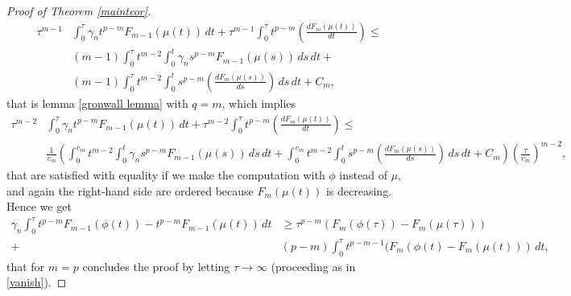 \documentclass[12pt]{article}
\theoremstyle{definition}
\theoremstyle{plain}
\theoremstyle{definition}
\begin{document}
\begin{proof}[Proof of Theorem \ref{mainteor}]
\begin{equation}
\begin{split}
            \tau^{m-1}&\int_0^\tau\gamma_nt^{p-m}F_{m-1}(\mu(t))\,dt+\tau^{m-1}\int_0^\tau t^{p-m}\left(\frac{dF_m(\mu(t))}{dt}\right)\leq\\&(m-1)\int_0^\tau t^{m-2}\int_0^t\gamma_n s^{p-m}F_{m-1}(\mu(s))\,ds\,dt+\\&(m-1)\int_0^\tau t^{m-2}\int_0^t s^{p-m}\left(\frac{dF_m(\mu(s))}{ds}\right)\,ds\,dt+C_m,
        \end{split}
    \end{equation}
    that is lemma \ref{gronwall lemma} with $q=m$, which implies
    \begin{equation*}
        \begin{split}
            \tau^{m-2}&\int_0^\tau\gamma_nt^{p-m}F_{m-1}(\mu(t))\,dt+\tau^{m-2}\int_0^\tau t^{p-m}\left(\frac{dF_m(\mu(t))}{dt}\right)\leq\\ &\frac{1}{v_m}\left(\int_0^{v_m}t^{m-2}\int_0^t\gamma_ns^{p-m}F_{m-1}(\mu(s))\,ds\,dt+\int_0^{v_m}t^{m-2}\int_0^ts^{p-m}\left(\frac{dF_m(\mu(s))}{ds}\right)\,ds\,dt+C_m\right)\left(\frac{\tau}{v_m}\right)^{m-2},
        \end{split}
    \end{equation*}
    that are satisfied with equality if we make the computation with $\phi$ instead of $\mu$, and again the right-hand side are ordered because $F_m(\mu(t))$ is decreasing. Hence we get
    \begin{equation*}
        \begin{split}
            \gamma_n\int_0^\tau t^{p-m}F_{m-1}(\phi(t))-t^{p-m}F_{m-1}(\mu(t))\,dt&\geq\tau^{p-m}(F_m(\phi(\tau))-F_m(\mu(\tau)))\\+&(p-m)\int_0^\tau t^{p-m-1}(F_m(\phi(t)-F_m(\mu(t)))\,dt,
        \end{split}
    \end{equation*}
    that for $m=p$ concludes the proof by letting $\tau\to\infty$ (proceeding as in \eqref{vanish}).
\end{proof}
\end{document}
